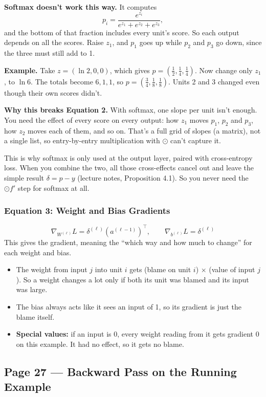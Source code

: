 \textbf{Softmax doesn't work this way.} It computes
\[
p_i = \frac{e^{z_i}}{e^{z_1} + e^{z_2} + e^{z_3}},
\]
and the bottom of that fraction includes every unit's score. So each output depends on all the scores. Raise $z_1$, and $p_1$ goes up while $p_2$ and $p_3$ go down, since the three must still add to 1.

\textbf{Example.} Take $z=(\ln 2, 0, 0)$, which gives $p=(\tfrac12, \tfrac14, \tfrac14)$. Now change only $z_1$, to $\ln 6$. The totals become $6, 1, 1$, so $p=(\tfrac34, \tfrac18, \tfrac18)$. Units 2 and 3 changed even though their own scores didn't.

\textbf{Why this breaks Equation 2.} With softmax, one slope per unit isn't enough. You need the effect of every score on every output: how $z_1$ moves $p_1$, $p_2$ and $p_3$, how $z_2$ moves each of them, and so on. That's a full grid of slopes (a matrix), not a single list, so entry-by-entry multiplication with $\odot$ can't capture it.

This is why softmax is only used at the output layer, paired with cross-entropy loss. When you combine the two, all those cross-effects cancel out and leave the simple result $\delta = p - y$ (lecture notes, Proposition 4.1). So you never need the $\odot f'$ step for softmax at all.

\subsubsection*{Equation 3: Weight and Bias Gradients}
\[
\nabla_{W^{(\ell)}} L = \delta^{(\ell)} \left(a^{(\ell-1)}\right)^{\top}, \qquad \nabla_{b^{(\ell)}} L = \delta^{(\ell)}
\]
This gives the gradient, meaning the ``which way and how much to change'' for each weight and bias.
\begin{itemize}[leftmargin=*]
  \item The weight from input $j$ into unit $i$ gets (blame on unit $i$) $\times$ (value of input $j$). So a weight changes a lot only if both its unit was blamed and its input was large.
  \item The bias always acts like it sees an input of 1, so its gradient is just the blame itself.
  \item \textbf{Special values:} if an input is 0, every weight reading from it gets gradient 0 on this example. It had no effect, so it gets no blame.
\end{itemize}

\subsection*{Page 27 --- Backward Pass on the Running Example}

